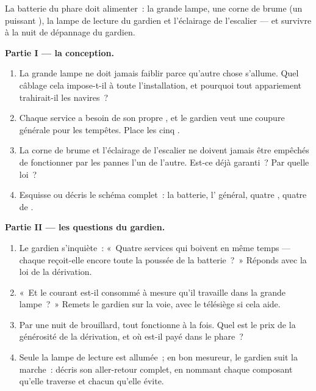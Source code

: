 \begin{problem}\label{pb:g7:circuits-series-parallel:1}
La batterie du phare doit alimenter~: la grande lampe, une corne de
brume (un puissant ), la lampe de lecture du gardien et
l'éclairage de l'escalier --- et survivre à la nuit de dépannage du
gardien.

\medskip\noindent\textbf{Partie I --- la conception.}
\begin{enumerate}
  \item La grande lampe ne doit jamais faiblir parce qu'autre chose
        s'allume. Quel câblage cela impose-t-il à toute
        l'installation, et pourquoi tout appariement 
        trahirait-il les navires~?
  \item Chaque service a besoin de son propre , et le
        gardien veut une coupure générale pour les tempêtes. Place
        les cinq .
  \item La corne de brume et l'éclairage de l'escalier ne doivent
        jamais être empêchés de fonctionner par les pannes l'un de
        l'autre. Est-ce déjà garanti~? Par quelle loi~?
  \item Esquisse ou décris le schéma complet~: la batterie,
        l' général, quatre , quatre
         de .
\end{enumerate}

\medskip\noindent\textbf{Partie II --- les questions du gardien.}
\begin{enumerate}[resume]
  \item Le gardien s'inquiète~: «~Quatre services qui boivent en même
        temps --- chaque  reçoit-elle encore toute la poussée
        de la batterie~?~» Réponds avec la loi de la dérivation.
  \item «~Et le courant est-il consommé à mesure qu'il travaille
        dans la grande lampe~?~» Remets le gardien sur la voie, avec
        le télésiège si cela aide.
  \item Par une nuit de brouillard, tout fonctionne à la fois. Quel
        est le prix de la générosité de la dérivation, et où
        est-il payé dans le phare~?
  \item Seule la lampe de lecture est allumée~; en bon mesureur, le
        gardien suit la marche~: décris son aller-retour complet, en
        nommant chaque composant qu'elle traverse et chacun qu'elle
        évite.
\end{enumerate}


\end{problem}
